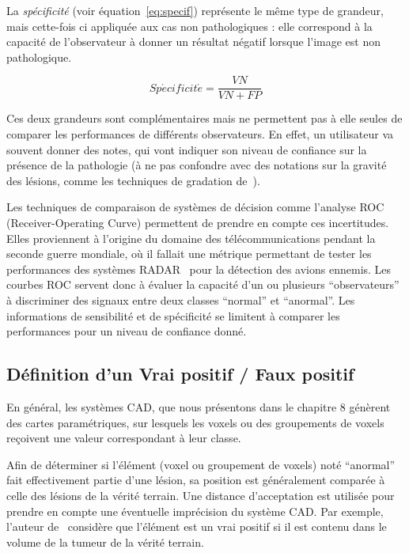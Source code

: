 La \emph{spécificité} (voir équation~\ref{eq:specif}) représente le même type de grandeur, mais cette-fois ci appliquée aux cas non pathologiques : elle correspond à la capacité de l'observateur à donner un résultat négatif lorsque l'image est non pathologique.

\begin{equation}
	\label{eq:specif}
	Sp\acute{e}cificit\acute{e} = \frac{VN}{VN + FP}
\end{equation}

Ces deux grandeurs sont complémentaires mais ne permettent pas à elle seules de comparer les performances de différents observateurs. En effet, un  utilisateur va souvent donner des notes, qui vont indiquer son niveau de confiance sur la présence de la pathologie (à ne pas confondre avec des notations sur la gravité des lésions, comme les techniques de gradation de~\cite{genestie1998comparison}).

Les techniques de comparaison de systèmes de décision comme l'analyse ROC (Receiver-Operating Curve) permettent de prendre en compte ces incertitudes. Elles proviennent à l'origine du domaine des télécommunications pendant la seconde guerre mondiale, où il fallait une métrique permettant de tester les performances des systèmes RADAR~\cite{zou2007receiver} pour la détection des avions ennemis. Les courbes ROC servent donc à évaluer la capacité d'un ou plusieurs ``observateurs'' à discriminer des signaux entre deux classes ``normal'' et ``anormal''. Les informations de sensibilité et de spécificité se limitent à comparer les performances pour un niveau de confiance donné.

\subsection{Définition d'un Vrai positif / Faux positif}

En général, les systèmes CAD, que nous présentons dans le chapitre 8 génèrent des cartes paramétriques, sur lesquels les voxels ou des groupements de voxels reçoivent une valeur correspondant à leur classe. 

Afin de déterminer si l'élément (voxel ou groupement de voxels) noté ``anormal'' fait effectivement partie d'une lésion, sa  position est généralement comparée à celle des lésions de la vérité terrain. Une distance d'acceptation est utilisée pour prendre en compte une éventuelle imprécision du système CAD. Par exemple, l'auteur de~\cite{paik2004surface} considère que l'élément est un vrai positif si il est contenu dans le volume de la tumeur de la vérité terrain.

